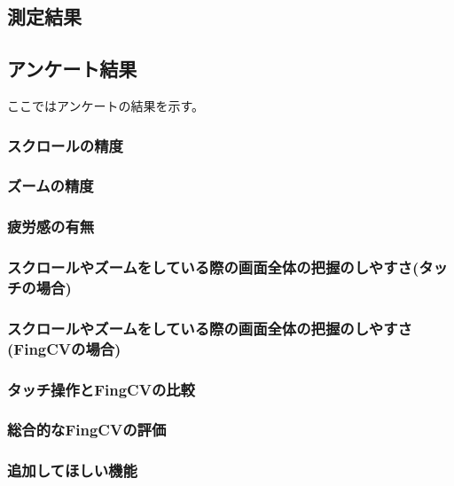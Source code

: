 \documentclass[11pt,a4j, titlepage]{jarticle} %
\begin{document}
\subsection{測定結果}


\subsection{アンケート結果}
ここではアンケートの結果を示す。

\subsubsection{スクロールの精度}


\subsubsection{ズームの精度}


\subsubsection{疲労感の有無}



\subsubsection{スクロールやズームをしている際の画面全体の把握のしやすさ(タッチの場合)}



\subsubsection{スクロールやズームをしている際の画面全体の把握のしやすさ(FingCVの場合)}



\subsubsection{タッチ操作とFingCVの比較}


\subsubsection{総合的なFingCVの評価}


\subsubsection{追加してほしい機能}
\end{document}

